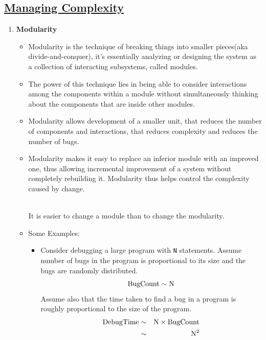 \documentclass{article}
\begin{document}
\subsection*{\underline{Managing Complexity}}

\begin{enumerate}
    \item \textbf{Modularity}
    \begin{itemize}
        \item Modularity is the technique of breaking things into smaller pieces(aka divide-and-conquer), it's essentially analyzing or designing the system as a collection of interacting subsystems, called modules.
        \item The power of this technique lies in being able to consider interactions among the components within a module without simultaneously thinking about the components that are inside other modules.
        \item Modularity allows development of a smaller unit, that reduces the number of components and interactions, that reduces complexity and reduces the number of bugs.
        \item Modularity makes it easy to replace an inferior module with an improved one, thus allowing incremental improvement of a system without completely rebuilding it. Modularity thus helps control the complexity caused by change.
        \begin{tcolorbox} [title= Design Principle:, colback=black!10!white]
            \\
            It is easier to change a module than to change the modularity.
        \end{tcolorbox}
        \item[] Some Examples:
        \begin{itemize}
            \item Consider debugging a large program with \lstinline|N| statements. Assume number of bugs in the program is proportional to its size and the bugs are randomly distributed.
            $$ \text{BugCount}\sim \text{\lstinline|N|}$$
            Assume also that the time taken to find a bug in a program is roughly proportional to the size of the program.
            \begin{eqnarray*}
                \text{DebugTime}&\sim&\text{\lstinline|N|}\times\text{BugCount}\\
                &\sim& \text{\lstinline|N|}^2

\end{eqnarray*}
\end{itemize}
\end{itemize}
\end{enumerate}
\end{document}
